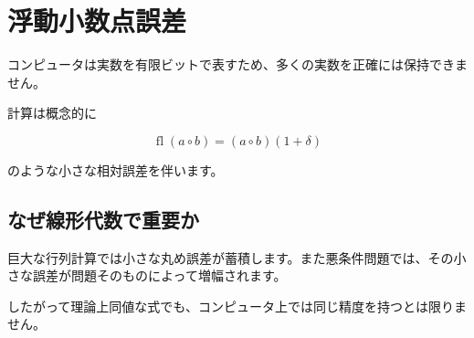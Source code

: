 \documentclass[
  11pt,
  a4paper,
]{ltjsarticle}
\author{}
\date{}
\begin{document}
\hypertarget{ux6d6eux52d5ux5c0fux6570ux70b9ux8aa4ux5dee}{%
\section{浮動小数点誤差}\label{ux6d6eux52d5ux5c0fux6570ux70b9ux8aa4ux5dee}}

コンピュータは実数を有限ビットで表すため、多くの実数を正確には保持できません。

計算は概念的に

\[
\operatorname{fl}(a\circ b)=(a\circ b)(1+\delta)
\]

のような小さな相対誤差を伴います。

\hypertarget{ux306aux305cux7ddaux5f62ux4ee3ux6570ux3067ux91cdux8981ux304b}{%
\subsection{なぜ線形代数で重要か}\label{ux306aux305cux7ddaux5f62ux4ee3ux6570ux3067ux91cdux8981ux304b}}

巨大な行列計算では小さな丸め誤差が蓄積します。また悪条件問題では、その小さな誤差が問題そのものによって増幅されます。

したがって理論上同値な式でも、コンピュータ上では同じ精度を持つとは限りません。
\end{document}
